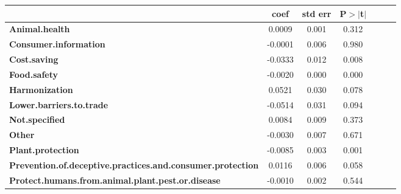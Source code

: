 \begin{table}[ht]
    
    \begin{center}
        \begin{tabular}{lcccccc}
                                                                   & \textbf{coef} & \textbf{std err} &\textbf{P$> |$t$|$}\\
                                                                   \midrule
                                                                   \textbf{Animal.health}                                             &       0.0009  &        0.001     &        0.312       \\
                                                                   \textbf{Consumer.information}                                      &      -0.0001  &        0.006     &        0.980       \\
                                                                   \textbf{Cost.saving}                                               &      -0.0333  &        0.012     &        0.008       \\
                                                                   \textbf{Food.safety}                                               &      -0.0020  &        0.000     &        0.000       \\
                                                                   \textbf{Harmonization}                                             &       0.0521  &        0.030     &        0.078       \\
                                                                   \textbf{Lower.barriers.to.trade}                                   &      -0.0514  &        0.031     &        0.094       \\
\textbf{Not.specified}                                             &       0.0084  &        0.009     &        0.373       \\
\textbf{Other}                                                     &      -0.0030  &        0.007     &        0.671       \\
\textbf{Plant.protection}                                          &      -0.0085  &        0.003     &        0.001       \\
\textbf{Prevention.of.deceptive.practices.and.consumer.protection} &       0.0116  &        0.006     &        0.058       \\
\textbf{Protect.humans.from.animal.plant.pest.or.disease}          &      -0.0010  &        0.002     &        0.544       \\

\end{tabular}
\end{center}
\end{table}
